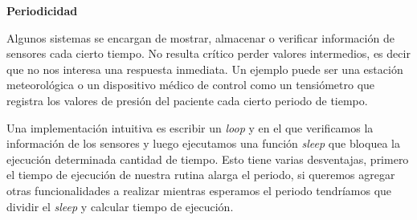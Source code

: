 \begin{figure}[H]
\begin{center}
{
}
\end{center}
\end{figure}


\textbf{Periodicidad}

Algunos sistemas se encargan de mostrar, almacenar o verificar información de sensores cada cierto tiempo. No resulta crítico perder valores intermedios, es decir que no nos interesa una respuesta inmediata. Un ejemplo puede ser una estación meteorológica o un dispositivo médico de control como un tensiómetro que registra los valores de presión del paciente cada cierto periodo de tiempo.

Una implementación intuitiva es escribir un \textit{loop} y en el que verificamos la información de los sensores y luego ejecutamos una función \textit{sleep} que bloquea la ejecución determinada cantidad de tiempo. Esto tiene varias desventajas, primero el tiempo de ejecución de nuestra rutina alarga el periodo, si queremos agregar otras funcionalidades a realizar mientras esperamos el periodo tendríamos que dividir el \textit{sleep} y calcular tiempo de ejecución.

